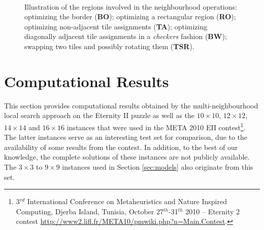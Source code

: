 \documentclass[preprint,12pt]{elsarticle}
\begin{document}
\begin{figure}
\centering
{}\hfill
{}\hfill
{}\\
\hspace{2em}
\caption{Illustration of the regions involved in the neighbourhood operations: \protect{} optimizing the border (\textbf{BO}); \protect{} optimizing a rectangular region (\textbf{RO}); \protect{} optimizing non-adjacent tile assignments (\textbf{TA}); \protect{} optimizing diagonally adjacent tile assignments in a \emph{checkers} fashion (\textbf{BW}); \protect{} swapping two tiles and possibly rotating them (\textbf{TSR}).}
\label{fig:neighbourhoods}
\end{figure}
%


\section{Computational Results}
\label{sec:e2results}

\noindent
This section provides computational results obtained by the multi-neighbourhood local search approach on the Eternity II puzzle as well as the $10\times 10$, $12\times 12$, $14\times 14$ and $16\times 16$ instances that were used in the META 2010 EII contest\footnote{3$^{rd}$ International Conference on Metaheuristics and Nature Inspired Computing, Djerba Island, Tunisia, October 27$^{th}$-31$^{th}$ 2010 -- Eternity 2 contest \url{http://www2.lifl.fr/META10/pmwiki.php?n=Main.Contest}.}.
The latter instances serve as an interesting test set for comparison, due to the availability of some results from the contest.
In addition, to the best of our knowledge, the complete solutions of these instances are not publicly available. 
The $3\times 3$ to $9\times 9$ instances used in Section \ref{sec:models} also originate from this set.
\end{document}
